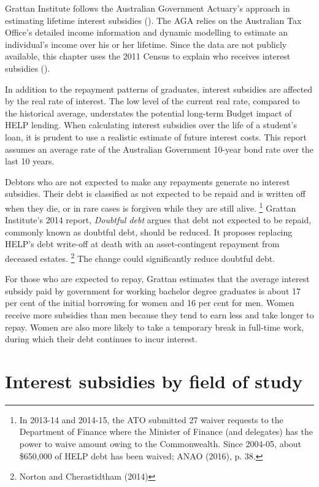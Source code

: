 \documentclass[embargoed]{grattan}
\begin{document}
Grattan Institute follows the Australian Government Actuary's approach in estimating lifetime interest subsidies ().
The \gls{AGA} relies on the Australian Tax Office's detailed income information and dynamic modelling to estimate an individual's income over his or her lifetime.
Since the data are not publicly available, this chapter uses the 2011 Census to explain who receives interest subsidies ().

In addition to the repayment patterns of graduates, interest subsidies are affected by the real rate of interest.
The low level of the current real rate, compared to the historical average, understates the potential long-term Budget impact of \gls{HELP} lending.
When calculating interest subsidies over the life of a student's loan, it is prudent to use a realistic estimate of future interest costs.
This report assumes an average rate of the Australian Government 10-year bond rate over the last 10 years.


Debtors who are not expected to make any repayments generate no interest subsidies.
Their debt is classified as not expected to be repaid and is written off when they die, or in rare cases is forgiven while they are still alive.%
\footnote{In 2013-14 and 2014-15, the \gls{ATO} submitted 27 waiver requests to the Department of Finance where the Minister of Finance (and delegates) has the power to waive amount owing to the Commonwealth.
Since 2004-05, about \$650,000 of \gls{HELP} debt has been waived; ANAO (2016), p. 38.} Grattan Institute's 2014 report, \emph{Doubtful debt} argues that debt not expected to be repaid, commonly known as doubtful debt, should be reduced.
It proposes replacing \gls{HELP}'s debt write-off at death with an asset-contingent repayment from deceased estates.%
\footnote{Norton and Cherastidtham (2014)} The change could significantly reduce doubtful debt.

For those who are expected to repay, Grattan estimates that the average interest subsidy paid by government for working bachelor degree graduates is about 17 per cent of the initial borrowing for women and 16 per cent for men.
Women receive more subsidies than men because they tend to earn less and take longer to repay.
Women are also more likely to take a temporary break in full-time work, during which their debt continues to incur interest.

\section{Interest subsidies by field of study}\label{interest-subsidies-by-field-of-study}
\end{document}
